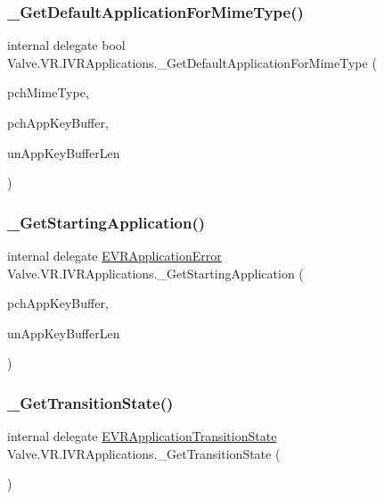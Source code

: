 \subsubsection{\texorpdfstring{\_GetDefaultApplicationForMimeType()}{\_GetDefaultApplicationForMimeType()}}
{\footnotesize\ttfamily internal delegate bool Valve.\+V\+R.\+I\+V\+R\+Applications.\+\_\+\+Get\+Default\+Application\+For\+Mime\+Type (\begin{DoxyParamCaption}\item[{string}]{pch\+Mime\+Type,  }\item[{System.\+Text.\+String\+Builder}]{pch\+App\+Key\+Buffer,  }\item[{uint}]{un\+App\+Key\+Buffer\+Len }\end{DoxyParamCaption})}

\mbox{\label{struct_valve_1_1_v_r_1_1_i_v_r_applications_a1eb7aeb6422c2a09ecf379532597cb05}} 
\subsubsection{\texorpdfstring{\_GetStartingApplication()}{\_GetStartingApplication()}}
{\footnotesize\ttfamily internal delegate \mbox{\hyperlink{namespace_valve_1_1_v_r_a3488adab8a219b579fcee50f4e63a8b6}{E\+V\+R\+Application\+Error}} Valve.\+V\+R.\+I\+V\+R\+Applications.\+\_\+\+Get\+Starting\+Application (\begin{DoxyParamCaption}\item[{System.\+Text.\+String\+Builder}]{pch\+App\+Key\+Buffer,  }\item[{uint}]{un\+App\+Key\+Buffer\+Len }\end{DoxyParamCaption})}

\mbox{\label{struct_valve_1_1_v_r_1_1_i_v_r_applications_a047619f84dbe4e1fc9faadd800669ac3}} 
\subsubsection{\texorpdfstring{\_GetTransitionState()}{\_GetTransitionState()}}
{\footnotesize\ttfamily internal delegate \mbox{\hyperlink{namespace_valve_1_1_v_r_af00430caae64a19e9ad612ac01a208c0}{E\+V\+R\+Application\+Transition\+State}} Valve.\+V\+R.\+I\+V\+R\+Applications.\+\_\+\+Get\+Transition\+State (\begin{DoxyParamCaption}{ }\end{DoxyParamCaption})}

